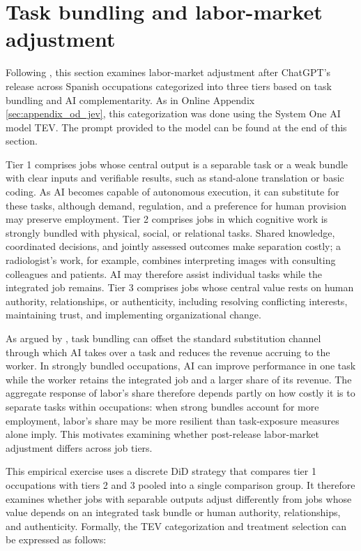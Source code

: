 \clearpage
\section{Task bundling and labor-market adjustment}
\label{sec:v1_job_tiers}
Following \citet{garicano2026messy}, this section examines labor-market adjustment after ChatGPT's release across Spanish occupations categorized into three tiers based on task bundling and AI complementarity. As in Online Appendix \ref{sec:appendix_od_jev}, this categorization was done using the System One AI model TEV. The prompt provided to the model can be found at the end of this section.

Tier 1 comprises jobs whose central output is a separable task or a weak bundle with clear inputs and verifiable results, such as stand-alone translation or basic coding. As AI becomes capable of autonomous execution, it can substitute for these tasks, although demand, regulation, and a preference for human provision may preserve employment. Tier 2 comprises jobs in which cognitive work is strongly bundled with physical, social, or relational tasks. Shared knowledge, coordinated decisions, and jointly assessed outcomes make separation costly; a radiologist's work, for example, combines interpreting images with consulting colleagues and patients. AI may therefore assist individual tasks while the integrated job remains. Tier 3 comprises jobs whose central value rests on human authority, relationships, or authenticity, including resolving conflicting interests, maintaining trust, and implementing organizational change.

As argued by \citet{garicano2026weak}, task bundling can offset the standard substitution channel through which AI takes over a task and reduces the revenue accruing to the worker. In strongly bundled occupations, AI can improve performance in one task while the worker retains the integrated job and a larger share of its revenue. The aggregate response of labor's share therefore depends partly on how costly it is to separate tasks within occupations: when strong bundles account for more employment, labor's share may be more resilient than task-exposure measures alone imply. This motivates examining whether post-release labor-market adjustment differs across job tiers.

This empirical exercise uses a discrete DiD strategy that compares tier 1 occupations with tiers 2 and 3 pooled into a single comparison group. It therefore examines whether jobs with separable outputs adjust differently from jobs whose value depends on an integrated task bundle or human authority, relationships, and authenticity. Formally, the TEV categorization and treatment selection can be expressed as follows:

